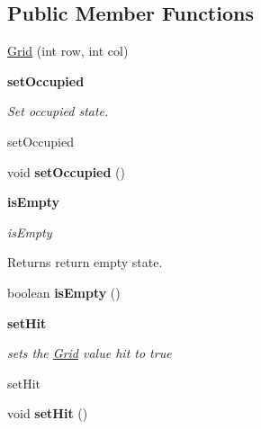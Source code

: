 \subsection*{Public Member Functions}
\begin{DoxyCompactItemize}
\item 
\hyperlink{classbattleship_1_1gameboard_1_1Grid_a4e9c1024401357d1d40f37498db53aea}{Grid} (int row, int col)
\end{DoxyCompactItemize}
\begin{Indent}{\bf set\+Occupied}\par
{\em Set occupied state.

set\+Occupied }\begin{DoxyCompactItemize}
\item 
\hypertarget{classbattleship_1_1gameboard_1_1Grid_a7eae104fb11d83e18463f4c025f14642}{}void {\bfseries set\+Occupied} ()\label{classbattleship_1_1gameboard_1_1Grid_a7eae104fb11d83e18463f4c025f14642}

\end{DoxyCompactItemize}
\end{Indent}
\begin{Indent}{\bf is\+Empty}\par
{\em is\+Empty

\begin{DoxyReturn}{Returns}
return empty state. 
\end{DoxyReturn}
}\begin{DoxyCompactItemize}
\item 
\hypertarget{classbattleship_1_1gameboard_1_1Grid_a91a91b3c7644a7bc1956d26e3b34f120}{}boolean {\bfseries is\+Empty} ()\label{classbattleship_1_1gameboard_1_1Grid_a91a91b3c7644a7bc1956d26e3b34f120}

\end{DoxyCompactItemize}
\end{Indent}
\begin{Indent}{\bf set\+Hit}\par
{\em sets the \hyperlink{classbattleship_1_1gameboard_1_1Grid}{Grid} value hit to true

set\+Hit }\begin{DoxyCompactItemize}
\item 
\hypertarget{classbattleship_1_1gameboard_1_1Grid_ab261556ee22f82d34f85f47f619f86e8}{}void {\bfseries set\+Hit} ()\label{classbattleship_1_1gameboard_1_1Grid_ab261556ee22f82d34f85f47f619f86e8}

\end{DoxyCompactItemize}
\end{Indent}
